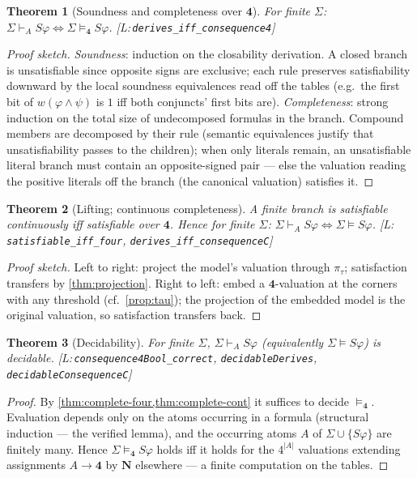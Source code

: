 \documentclass[11pt,a4paper]{article}
\newtheorem{theorem}{Theorem}[section]
\theoremstyle{definition}
\newcommand{\FOUR}{\mathbf{4}}
\newcommand{\vN}{\mathbf{N}}
\newcommand{\proj}[1]{\pi_{#1}}
\newcommand{\dershort}{\vdash_{\!A}}
\newcommand{\lean}[1]{\texttt{#1}}
\begin{document}
\begin{theorem}[Soundness and completeness over $\FOUR$]\label{thm:complete-four}
For finite $\Sigma$:
$\Sigma\dershort S\varphi \iff \Sigma\models_{\FOUR} S\varphi$.
[L:\,\lean{derives\_iff\_consequence4}]
\end{theorem}
\begin{proof}[Proof sketch]
\emph{Soundness}: induction on the closability derivation. A closed branch
is unsatisfiable since opposite signs are exclusive; each rule preserves
satisfiability downward by the local soundness equivalences read off the
tables (e.g.\ the first bit of $w(\varphi\wedge\psi)$ is $1$ iff both
conjuncts' first bits are). \emph{Completeness}: strong induction on the
total size of undecomposed formulas in the branch. Compound members are
decomposed by their rule (semantic equivalences justify that
unsatisfiability passes to the children); when only literals remain, an
unsatisfiable literal branch must contain an opposite-signed pair --- else
the valuation reading the positive literals off the branch (the canonical
valuation) satisfies it.
\end{proof}

\begin{theorem}[Lifting; continuous completeness]\label{thm:complete-cont}
A finite branch is satisfiable continuously iff satisfiable over $\FOUR$.
Hence for finite $\Sigma$:
$\Sigma\dershort S\varphi \iff \Sigma\models S\varphi$.
[L:\,\lean{satisfiable\_iff\_four}, \lean{derives\_iff\_consequenceC}]
\end{theorem}
\begin{proof}[Proof sketch]
Left to right: project the model's valuation through $\proj{\tau}$;
satisfaction transfers by \cref{thm:projection}. Right to left: embed a
$\FOUR$-valuation at the corners with any threshold (cf.\
\cref{prop:tau}); the projection of the embedded model is the original
valuation, so satisfaction transfers back.
\end{proof}

\begin{theorem}[Decidability]\label{thm:decidable}
For finite $\Sigma$, $\Sigma\dershort S\varphi$ (equivalently
$\Sigma\models S\varphi$) is decidable.
[L:\,\lean{consequence4Bool\_correct}, \lean{decidableDerives},
\lean{decidableConsequenceC}]
\end{theorem}
\begin{proof}
By \cref{thm:complete-four,thm:complete-cont} it suffices to decide
$\models_{\FOUR}$. Evaluation depends only on the atoms occurring in a
formula (structural induction --- the verified lemma), and the occurring
atoms $A$ of $\Sigma\cup\{S\varphi\}$ are finitely many. Hence
$\Sigma\models_{\FOUR}S\varphi$ holds iff it holds for the $4^{|A|}$
valuations extending assignments $A\to\FOUR$ by $\vN$ elsewhere --- a
finite computation on the tables.
\end{proof}
\end{document}
